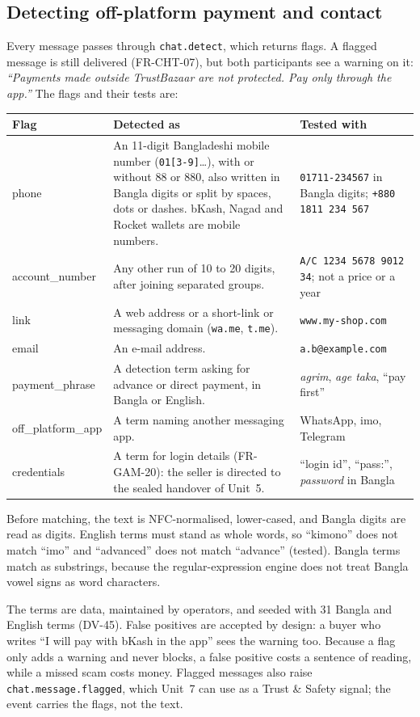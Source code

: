 \documentclass[11pt,a4paper]{article}
\newenvironment{dtable}[1]{\small\begin{longtable}{#1}}{\end{longtable}}
\begin{document}
\subsection{Detecting off-platform payment and contact}
\label{sec:detect}
Every message passes through \texttt{chat.detect}, which returns flags. A flagged message is still delivered (FR-CHT-07), but both participants see a warning on it: \emph{``Payments made outside TrustBazaar are not protected. Pay only through the app.''} The flags and their tests are:
\begin{dtable}{@{}>{\ttfamily\raggedright\arraybackslash}p{3.2cm}>{\raggedright\arraybackslash}p{7.6cm}>{\raggedright\arraybackslash}p{4.4cm}@{}}
\toprule
\textnormal{\textbf{Flag}} & \textbf{Detected as} & \textbf{Tested with} \\ \midrule \endhead
phone & An 11-digit Bangladeshi mobile number (\texttt{01[3-9]}\ldots), with or without 88 or 880, also written in Bangla digits or split by spaces, dots or dashes. bKash, Nagad and Rocket wallets are mobile numbers. & \texttt{01711-234567} in Bangla digits; \texttt{+880 1811 234 567} \\
account\_number & Any other run of 10 to 20 digits, after joining separated groups. & \texttt{A/C 1234 5678 9012 34}; not a price or a year \\
link & A web address or a short-link or messaging domain (\texttt{wa.me}, \texttt{t.me}). & \texttt{www.my-shop.com} \\
email & An e-mail address. & \texttt{a.b@example.com} \\
payment\_phrase & A detection term asking for advance or direct payment, in Bangla or English. & \emph{agrim}, \emph{age taka}, ``pay first'' \\
off\_platform\_app & A term naming another messaging app. & WhatsApp, imo, Telegram \\
credentials & A term for login details (FR-GAM-20): the seller is directed to the sealed handover of Unit~5. & ``login id'', ``pass:'', \emph{password} in Bangla \\
\bottomrule
\end{dtable}
Before matching, the text is NFC-normalised, lower-cased, and Bangla digits are read as digits. English terms must stand as whole words, so ``kimono'' does not match ``imo'' and ``advanced'' does not match ``advance'' (tested). Bangla terms match as substrings, because the regular-expression engine does not treat Bangla vowel signs as word characters.

The terms are data, maintained by operators, and seeded with 31 Bangla and English terms (DV-45). False positives are accepted by design: a buyer who writes ``I will pay with bKash in the app'' sees the warning too. Because a flag only adds a warning and never blocks, a false positive costs a sentence of reading, while a missed scam costs money. Flagged messages also raise \texttt{chat.message.flagged}, which Unit~7 can use as a Trust \& Safety signal; the event carries the flags, not the text.
\end{document}
